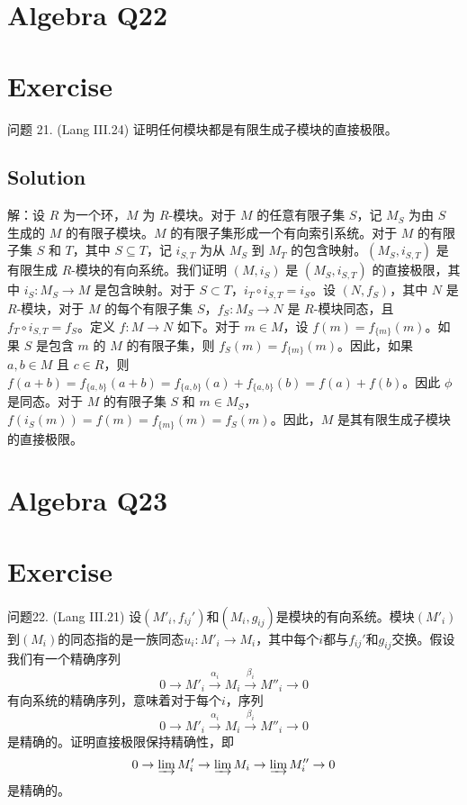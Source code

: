 \documentclass[12pt]{book}
\begin{document}
\section{Algebra Q22}
\section*{Exercise}
问题 21. (Lang III.24) 证明任何模块都是有限生成子模块的直接极限。



\subsection*{Solution}
解：设 $R$ 为一个环，$M$ 为 $R$-模块。对于 $M$ 的任意有限子集 $S$，记 $M_S$ 为由 $S$ 生成的 $M$ 的有限子模块。$M$ 的有限子集形成一个有向索引系统。对于 $M$ 的有限子集 $S$ 和 $T$，其中 $S \subseteq T$，记 $i_{S,T}$ 为从 $M_S$ 到 $M_T$ 的包含映射。$(M_S, i_{S,T})$ 是有限生成 $R$-模块的有向系统。我们证明 $(M, i_S)$ 是 $(M_S, i_{S,T})$ 的直接极限，其中 $i_S: M_S \to M$ 是包含映射。对于 $S \subset T$，$i_T \circ i_{S,T} = i_S$。设 $(N, f_S)$，其中 $N$ 是 $R$-模块，对于 $M$ 的每个有限子集 $S$，$f_S: M_S \to N$ 是 $R$-模块同态，且 $f_T \circ i_{S,T} = f_S$。定义 $f: M \to N$ 如下。对于 $m \in M$，设 $f(m) = f_{\{m\}}(m)$。如果 $S$ 是包含 $m$ 的 $M$ 的有限子集，则 $f_S(m) = f_{\{m\}}(m)$。因此，如果 $a, b \in M$ 且 $c \in R$，则 $f(a+b) = f_{\{a,b\}}(a+b) = f_{\{a,b\}}(a) + f_{\{a,b\}}(b) = f(a) + f(b)$。因此 $\phi$ 是同态。对于 $M$ 的有限子集 $S$ 和 $m \in M_S$，$f(i_S(m)) = f(m) = f_{\{m\}}(m) = f_S(m)$。因此，$M$ 是其有限生成子模块的直接极限。
\newpage
\section{Algebra Q23}
\section*{Exercise}
问题22. (Lang III.21) 设$(M'_i, f_{ij}')$和$(M_i, g_{ij})$是模块的有向系统。模块$(M'_i)$到$(M_i)$的同态指的是一族同态$u_i : M'_i \to M_i$，其中每个$i$都与$f_{ij}'$和$g_{ij}$交换。假设我们有一个精确序列
\[0 \to M'_i \xrightarrow{\alpha_i} M_i \xrightarrow{\beta_i} M''_i \to 0\]
有向系统的精确序列，意味着对于每个$i$，序列
\[0 \to M'_i \xrightarrow{\alpha_i} M_i \xrightarrow{\beta_i} M''_i \to 0\]
是精确的。证明直接极限保持精确性，即
\[0 \to \varinjlim M'_i \to \varinjlim M_i \to \varinjlim M''_i \to 0\]
是精确的。
\end{document}
